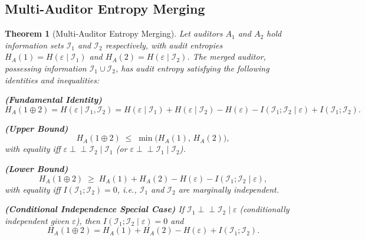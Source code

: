 \documentclass[12pt,a4paper]{article}
\newtheorem{theorem}{Theorem}[section]
\newcommand{\cI}{\mathcal{I}}
\begin{document}
\subsection{Multi-Auditor Entropy Merging}

\begin{theorem}[Multi-Auditor Entropy Merging]
\label{thm:merging}
Let auditors $A_1$ and $A_2$ hold information sets $\cI_1$ and $\cI_2$ respectively, with audit entropies $H_A(1)=H(\varepsilon\mid\cI_1)$ and $H_A(2)=H(\varepsilon\mid\cI_2)$. The merged auditor, possessing information $\cI_1 \cup \cI_2$, has audit entropy satisfying the following identities and inequalities:

\textbf{(Fundamental Identity)}
\begin{equation}\label{eq:merging-identity}
H_A(1\oplus 2) = H(\varepsilon \mid \cI_1, \cI_2)
= H(\varepsilon \mid \cI_1) + H(\varepsilon \mid \cI_2) - H(\varepsilon)
- I(\cI_1; \cI_2 \mid \varepsilon) + I(\cI_1; \cI_2).
\end{equation}

\textbf{(Upper Bound)}
\begin{equation}\label{eq:merging-ub}
H_A(1\oplus 2) \;\leq\; \min\bigl(H_A(1),\, H_A(2)\bigr),
\end{equation}
with equality iff $\varepsilon \perp\!\!\!\perp \cI_2 \mid \cI_1$ (or $\varepsilon \perp\!\!\!\perp \cI_1 \mid \cI_2$).

\textbf{(Lower Bound)}
\begin{equation}\label{eq:merging-lb}
H_A(1\oplus 2) \;\geq\; H_A(1) + H_A(2) - H(\varepsilon) - I(\cI_1; \cI_2 \mid \varepsilon),
\end{equation}
with equality iff $I(\cI_1; \cI_2) = 0$, i.e., $\cI_1$ and $\cI_2$ are marginally independent.

\textbf{(Conditional Independence Special Case)} If $\cI_1 \perp\!\!\!\perp \cI_2 \mid \varepsilon$ (conditionally independent given $\varepsilon$), then $I(\cI_1; \cI_2 \mid \varepsilon) = 0$ and
\begin{equation}\label{eq:merging-ci}
H_A(1\oplus 2) = H_A(1) + H_A(2) - H(\varepsilon) + I(\cI_1; \cI_2).
\end{equation}
\end{theorem}
\end{document}
